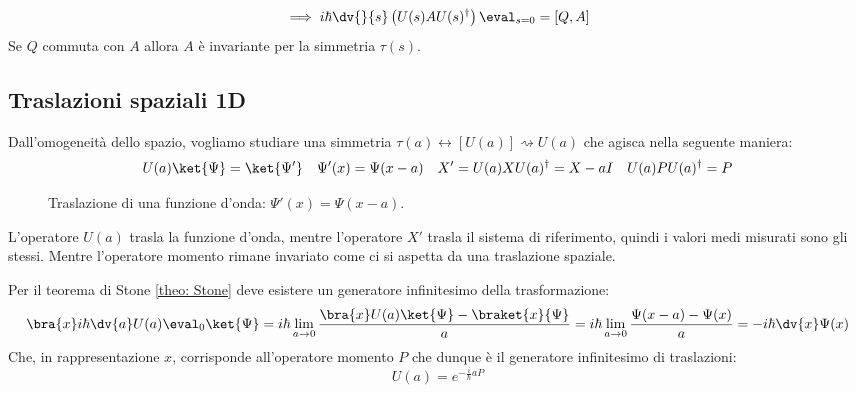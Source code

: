 \[
   \implies  i\hbar \dv{}{s}\left( U(s)AU(s)^\dagger \right)\eval_{s=0} = \left[ Q, A \right]
\]
Se \(Q\) commuta con \(A\) allora \(A\) è invariante per la simmetria \(\tau(s )\).


\subsection{Traslazioni spaziali 1D}
Dall'omogeneità dello spazio, vogliamo studiare una simmetria \(\tau(a) \leftrightarrow \left[ U(a) \right]\rightsquigarrow U(a)\) che agisca nella seguente maniera:
\[
    U(a)\ket{\Psi}= \ket{\Psi'} \quad \Psi'(x)= \Psi(x-a) \quad X' = U(a)XU(a)^\dagger = X- aI \quad U(a)P U(a)^\dagger = P
\]


\begin{figure}[h]
    \centering
    \caption{Traslazione di una funzione d'onda: $\Psi'(x)=\Psi(x-a)$.}
    \label{fig:traslazione-1d}
\end{figure}

L'operatore \(U(a)\) trasla la funzione d'onda, mentre l'operatore \(X'\) trasla il sistema di riferimento,
quindi i valori medi misurati sono gli stessi. 
Mentre l'operatore momento rimane invariato come ci si aspetta da una traslazione spaziale.

Per il teorema di Stone \ref{theo: Stone} deve esistere un generatore infinitesimo della trasformazione:
\[
    \bra{x} i\hbar\dv{a}U(a)\eval_{0}\ket{\Psi}= i\hbar \lim_{a\to 0 }   \frac{\bra{x}U(a)\ket{\Psi}-\braket{x}{\Psi}}{a}= i\hbar\lim_{a\to0 }\frac{\Psi(x-a)-\Psi(x)}{a} = -i\hbar \dv{x}\Psi(x)
\]
Che, in rappresentazione \(x\), corrisponde all'operatore momento \(P\) che dunque è il generatore infinitesimo di traslazioni:
\begin{equation}
    U(a) = e^{-\frac{i}{\hbar}aP}
\end{equation}


